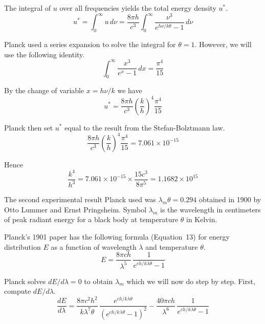 \documentclass[12pt]{article}
\begin{document}
\noindent
The integral of $u$ over all frequencies yields the total energy density $u^*$.
\begin{equation*}
u^{*}=\int_0^\infty u\,d\nu
=\frac{8\pi h}{c^3}\int_0^\infty\frac{\nu^3}{e^{h\nu/k\theta}-1}\,d\nu
\end{equation*}

\noindent
Planck used a series expansion to solve the integral for $\theta=1$.
However, we will use the following identity.
\begin{equation*}
\int_0^\infty\frac{x^3}{e^x-1}\,dx=\frac{\pi^4}{15}
\end{equation*}

\noindent
By the change of variable $x=h\nu/k$ we have
\begin{equation*}
u^*=\frac{8\pi h}{c^3}\left(\frac{k}{h}\right)^4\frac{\pi^4}{15}
\end{equation*}

\noindent
Planck then set $u^*$ equal to the result from the Stefan-Bolztmann law.
\begin{equation*}
\frac{8\pi h}{c^3}\left(\frac{k}{h}\right)^4\frac{\pi^4}{15}=7.061\times10^{-15}
\end{equation*}

\noindent
Hence
\begin{equation*}
\frac{k^4}{h^3}=7.061\times10^{-15}\times\frac{15c^3}{8\pi^5}=1.1682\times10^{15}
\end{equation*}

\bigskip
\noindent
The second experimental result Planck used was $\lambda_m\theta=0.294$ obtained in 1900 by
Otto Lummer and Ernst Pringsheim.
Symbol $\lambda_m$ is the wavelength in centimeters
of peak radiant energy for a black body at temperature $\theta$ in Kelvin.

\bigskip
\noindent
Planck's 1901 paper has the following formula (Equation~13)
for energy distribution $E$ as a function of wavelength $\lambda$ and temperature $\theta$.
\begin{equation*}
E=\frac{8\pi ch}{\lambda^5}\,\frac{1}{e^{ch/k\lambda\theta}-1}
\end{equation*}

\noindent
Planck solves $dE/d\lambda=0$ to obtain $\lambda_m$ which we will now do step by step.
First, compute $dE/d\lambda$.
\begin{equation*}
\frac{dE}{d\lambda}
=\frac{8\pi c^2h^2}{k\lambda^7\theta}\,\frac{e^{ch/k\lambda\theta}}{(e^{ch/k\lambda\theta}-1)^2}
-\frac{40\pi ch}{\lambda^6}\,\frac{1}{e^{ch/k\lambda\theta}-1}
\end{equation*}
\end{document}

